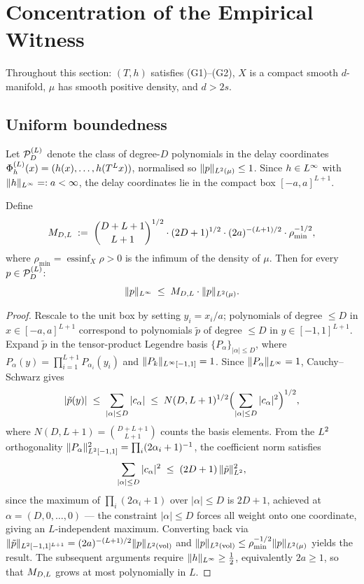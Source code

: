\section{Concentration of the Empirical Witness}
\label{sec:concentration}

Throughout this section: $(T,h)$ satisfies (G1)--(G2), $X$ is a compact
smooth $d$-manifold, $\mu$ has smooth positive density, and $d > 2s$.

\subsection{Uniform boundedness}
\label{subsec:bounded}

Let $\mathcal{P}_D^{(L)}$ denote the class of degree-$D$ polynomials in the delay coordinates
$\Phi_h^{(L)}(x) = (h(x),\ldots,h(T^L x))$, normalised so $\|p\|_{L^{2}(\mu)} \leq 1$.
Since $h \in L^{\infty}$ with $\|h\|_{L^{\infty}} =: a < \infty$, the delay
coordinates lie in the compact box $[-a,a]^{L+1}$.

\begin{lemma}
\label{lem:bounded}
Define
\[
  M_{D,L} \;:=\;
  \binom{D+L+1}{L+1}^{1/2}
  \cdot (2D+1)^{1/2}
  \cdot (2a)^{-(L+1)/2}
  \cdot \rho_{\min}^{-1/2},
\]
where $\rho_{\min} = \operatorname{essinf}_X \rho > 0$ is the infimum of
the density of $\mu$.
Then for every $p \in \mathcal{P}_D^{(L)}$:
\[
  \|p\|_{L^{\infty}} \;\leq\; M_{D,L} \cdot \|p\|_{L^{2}(\mu)}.
\]
\end{lemma}

\begin{proof}
Rescale to the unit box by setting $y_i = x_i/a$; polynomials of degree
$\leq D$ in $x \in [-a,a]^{L+1}$ correspond to polynomials $\tilde{p}$ of
degree $\leq D$ in $y \in [-1,1]^{L+1}$.
Expand $\tilde{p}$ in the tensor-product Legendre basis
$\{P_\alpha\}_{|\alpha|\leq D}$, where
$P_\alpha(y) = \prod_{i=1}^{L+1} P_{\alpha_i}(y_i)$ and $\|P_k\|_{L^{\infty}[-1,1]} = 1$.
Since $\|P_\alpha\|_{L^{\infty}} = 1$, Cauchy--Schwarz gives
\[
  |\tilde{p}(y)|
  \;\leq\; \sum_{|\alpha|\leq D} |c_\alpha|
  \;\leq\; N(D,L+1)^{1/2} \Bigl(\sum_{|\alpha|\leq D}|c_\alpha|^2\Bigr)^{1/2},
\]
where $N(D,L+1) = \binom{D+L+1}{L+1}$ counts the basis elements.
From the $L^{2}$ orthogonality
$\|P_\alpha\|_{L^{2}[-1,1]}^2 = \prod_i (2\alpha_i+1)^{-1}$,
the coefficient norm satisfies
\[
  \sum_{|\alpha|\leq D}|c_\alpha|^2
  \;\leq\; (2D+1)\,\|\tilde{p}\|_{L^{2}}^2,
\]
since the maximum of $\prod_i(2\alpha_i+1)$ over $|\alpha|\leq D$ is
$2D+1$, achieved at $\alpha=(D,0,\ldots,0)$ — the constraint $|\alpha|\leq D$
forces all weight onto one coordinate, giving an $L$-independent maximum.
Converting back via $\|\tilde{p}\|_{L^{2}[-1,1]^{L+1}}
= (2a)^{-(L+1)/2}\|p\|_{L^{2}(\mathrm{vol})}$ and
$\|p\|_{L^{2}(\mathrm{vol})} \leq \rho_{\min}^{-1/2}\|p\|_{L^{2}(\mu)}$
yields the result.
The subsequent arguments require $\|h\|_{L^{\infty}} \geq \frac{1}{2}$,
equivalently $2a \geq 1$, so that $M_{D,L}$ grows at most polynomially in $L$.
\end{proof}

